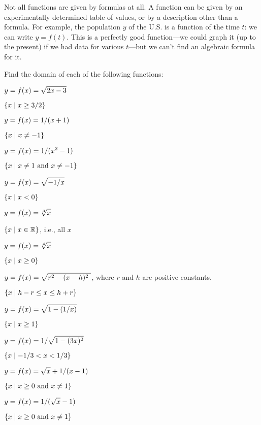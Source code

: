Not all functions are given by formulas at all.  A function can be
given by an experimentally determined table of values, or by a
description other than a formula.  For example, the population $y$ of
the U.S. is a function of the time $t$: we can write $y=f(t)$.  This
is a perfectly good function---we could graph it (up to the
present) if we had data for various $t$---but we can't find an
algebraic formula for it.

\begin{exercises}

Find the domain of each of the following functions:

\exercise $\displaystyle y=f(x)=\sqrt{2x-3}$
\begin{answer} $\displaystyle \{x\mid x\ge 3/2\}$
\end{answer}
\exercise $\displaystyle y=f(x)=1/(x+1)$
\begin{answer} $\displaystyle \{x\mid x\not=-1\}$
\end{answer}
\exercise $\displaystyle y=f(x)=1/(x^2-1)$
\begin{answer} $\displaystyle \{x\mid x\not=1 \hbox{ and } x\not=-1\}$
\end{answer}
\exercise $\displaystyle y=f(x)=\sqrt{-1/x}$
\begin{answer} $\displaystyle \{x\mid x<0\}$
\end{answer}
\exercise $\ds y=f(x)={\root 3 \of x}$
\begin{answer} $\displaystyle \{x\mid x\in \mathbb{R}\}$, i.e., all $x$
\end{answer}
\exercise $\ds y=f(x)={\root 4 \of x}$
\begin{answer} $\displaystyle \{x\mid x\ge0\}$
\end{answer}
\exercise $\displaystyle y=f(x)=\sqrt{r^2-(x-h)^2\ }$, where
$r$ and $h$ are positive constants.
\begin{answer} $\displaystyle \{x\mid h-r\le x\le h+r\}$
\end{answer}
\exercise $\displaystyle y=f(x)=\sqrt{1-(1/x)}$
\begin{answer} $\displaystyle \{x\mid x\ge 1\}$
\end{answer}
\exercise $\displaystyle y=f(x)=1/\sqrt{1-(3x)^2}$
\begin{answer} $\displaystyle \{x\mid -1/3< x< 1/3\}$
\end{answer}
\exercise $\displaystyle y=f(x)=\sqrt{x}+1/(x-1)$
\begin{answer} $\displaystyle \{x\mid x\ge0  \hbox{ and } x\not=1\}$
\end{answer}
\exercise $\displaystyle y=f(x)=1/(\sqrt{x}-1)$
\begin{answer} $\displaystyle \{x\mid x\ge0  \hbox{ and } x\not=1\}$
\end{answer}


\end{exercises}
